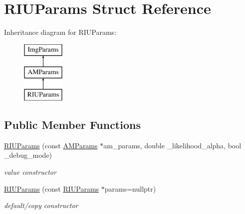 \hypertarget{structRIUParams}{\section{R\-I\-U\-Params Struct Reference}
\label{structRIUParams}
}
Inheritance diagram for R\-I\-U\-Params\-:\begin{figure}[H]
\begin{center}
\leavevmode
\includegraphics[height=3.000000cm]{structRIUParams}
\end{center}
\end{figure}
\subsection*{Public Member Functions}
\begin{DoxyCompactItemize}
\item 
\hypertarget{structRIUParams_a16ded8068839c9509e20d3af5ae99ac0}{\hyperlink{structRIUParams_a16ded8068839c9509e20d3af5ae99ac0}{R\-I\-U\-Params} (const \hyperlink{structAMParams}{A\-M\-Params} $\ast$am\-\_\-params, double \-\_\-likelihood\-\_\-alpha, bool \-\_\-debug\-\_\-mode)}\label{structRIUParams_a16ded8068839c9509e20d3af5ae99ac0}

\begin{DoxyCompactList}\small\item\em value constructor \end{DoxyCompactList}\item 
\hypertarget{structRIUParams_a9bd097e9e1ec26aa669799042338484e}{\hyperlink{structRIUParams_a9bd097e9e1ec26aa669799042338484e}{R\-I\-U\-Params} (const \hyperlink{structRIUParams}{R\-I\-U\-Params} $\ast$params=nullptr)}\label{structRIUParams_a9bd097e9e1ec26aa669799042338484e}

\begin{DoxyCompactList}\small\item\em default/copy constructor \end{DoxyCompactList}\end{DoxyCompactItemize}

